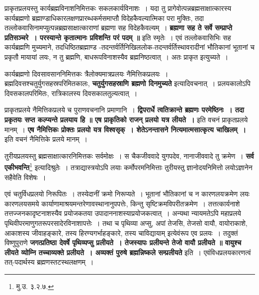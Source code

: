 	प्राकृतप्रलयस्तु कार्यब्रह्मविनाशनिमित्तकः सकलकार्यविनाशः~। यदा तु प्रागेवोत्पन्नब्रह्मसाक्षात्कारस्य कार्यब्रह्मणो ब्रह्माण्डाधिकारलक्षणप्रारब्धकर्मसमाप्तौ विदेहकैवल्यात्मिका परा मुक्तिः, तदा तल्लोकवासिनामप्युत्पन्नब्रह्मसाक्षात्काराणां ब्रह्मणा सह विदेहकैवल्यम्~। {\bfseries ब्रह्मणा सह ते सर्वे सम्प्राप्ते प्रतिसञ्चरे~। परस्यान्ते कृतात्मानः प्रविशन्ति परं पदम् ॥} इति स्मृतेः~। एवं तल्लोकवासिभिः सह कार्यब्रह्मणि मुच्यमाने, तदधिष्ठितब्रह्माण्ड -तदन्तर्वर्तिनिखिललोक-तदन्तर्वर्तिस्थावरादीनां भौतिकानां भूतानां च प्रकृतौ मायायां लयः, न तु ब्रह्मणि, बाधरूपविनाशस्यैव ब्रह्मनिष्ठत्वात्~। अतः प्राकृत इत्युच्यते~।\par
	कार्यब्रह्मणो दिवसावसाननिमित्तकः त्रैलोक्यमात्रप्रलयः नैमित्तिकप्रलयः~। ब्रह्मदिवसश्चतुर्युगसहस्रपरिमितकालः, {\bfseries चतुर्युगसहस्राणि ब्रह्मणो दिनमुच्यते} इत्यादिवचनात्~। प्रलयकालोऽपि दिवसकालपरिमितः, रात्रिकालस्य दिवसकालतुल्यत्वात्~।\par
	प्राकृतप्रलये नैमित्तिकप्रलये च पुराणवचनानि प्रमाणानि~। {\bfseries द्विपरार्धे त्वतिक्रान्ते ब्रह्मणः परमेष्ठिनः~। तदा प्रकृतयः सप्त कल्प्यन्ते प्रलयाय हि ॥ एष प्राकृतिको राजन् प्रलयो यत्र लीयते~।} इति वचनं प्राकृतप्रलये मानम्~। {\bfseries एष नैमित्तिकः प्रोक्तः प्रलयो यत्र विश्वसृक्~। शेतेऽनन्तासने नित्यमात्मसात्कृत्य चाखिलम्~।} इति वचनं नैमित्तिके प्रलये मानम्~।\par
	तुरीयप्रलयस्तु ब्रह्मसाक्षात्कारनिमित्तकः सर्वमोक्षः~। स चैकजीववादे युगपदेव, नानाजीववादे तु क्रमेण~। {\bfseries सर्व एकीभवन्ति}\footnote{मु.उ. ३.२.७.} इत्यादिश्रुतेः~। तत्राद्यास्त्रयोऽपि लयाः कर्मोपरमनिमित्ताः तुरीयस्तु ज्ञानोदयनिमित्तो लयोऽज्ञानेन सहैवेति विशेषः~।\par
	एवं चतुर्विधप्रलयो निरूपितः~। तस्येदानीं क्रमो निरूप्यते~। भूतानां भौतिकानां च न कारणलयक्रमेण लयः कारणलयसमये कार्याणामाश्रयमन्तरेणावस्थानानुपपत्तेः, किन्तु सृष्टिक्रमविपरीतक्रमेण~। तत्तत्कार्यनाशे तत्तज्जनकादृष्टनाशस्यैव प्रयोजकतया उपादाननाशस्याप्रयोजकत्वात्~। अन्यथा न्यायमतेऽपि महाप्रलये पृथिवीपरमाणुगतरूपरसादेरविनाशापत्तेः~। तथा च पृथिव्या अप्सु, अपां तेजसि, तेजसो वायौ, वायोराकाशे, आकाशस्य जीवाहङ्कारे, तस्य हिरण्यगर्भाहङ्कारे, तस्य चाविद्यायाम् इत्येवंरूप एव प्रलयः~। तदुक्तं विष्णुपुराणे {\bfseries जगत्प्रतिष्ठा देवर्षे पृथिव्यप्सु प्रलीयते~। तेजस्यापः प्रलीयन्ते तेजो वायौ प्रलीयते ॥ वायुश्च लीयते व्योम्नि तच्चाव्यक्ते प्रलीयते~। अव्यक्तं पुरुषे ब्रह्मन्निष्कले सम्प्रलीयते} इति~। एवंविधप्रलयकारणत्वं तत्-पदार्थस्य ब्रह्मणस्तटस्थलक्षणम्~।\par
